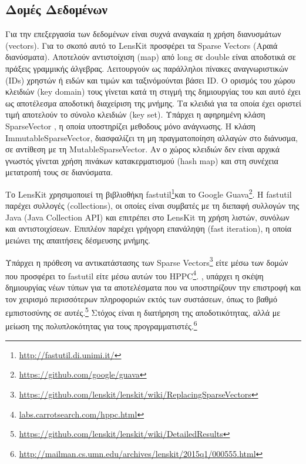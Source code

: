 \subsection{Δομές Δεδομένων}
Για την επεξεργασία των δεδομένων είναι συχνά αναγκαία η χρήση διανυσμάτων ({\en vectors}). Για το σκοπό αυτό το {\en LensKit} προσφέρει τα \en Sparse Vectors \el(Αραιά διανύσματα). Αποτελούν αντιστοίχιση ({\en map}) από {\en long} σε \en double  είναι αποδοτικά σε πράξεις γραμμικής άλγεβρας. Λειτουργούν ως παράλληλοι πίνακες αναγνωριστικών (\en IDs) \el χρηστών ή ειδών και τιμών και ταξινόμούνται βάσει \en ID. \el Ο ορισμός του χώρου κλειδιών (\en key domain) \el τους γίνεται κατά τη στιγμή της δημιουργίας του και αυτό έχει ως αποτέλεσμα αποδοτική διαχείριση της μνήμης. Τα κλειδιά για τα οποία έχει οριστεί τιμή αποτελούν το σύνολο κλειδιών \en(key set). \el Υπάρχει η αφηρημένη κλάση \en SparseVector \el, η οποία υποστηρίζει μεθοδους μόνο ανάγνωσης. Η κλάση \en ImmutableSparseVector, \el διασφαλίζει τη μη πραγματοποίηση αλλαγών στο διάνυσμα, σε αντίθεση με τη \en MutableSparseVector. \el Αν ο χώρος κλειδιών δεν είναι αρχικά γνωστός γίνεται χρήση πινάκων κατακερματισμού \en (hash map) \el και στη συνέχεια μετατροπή τους σε διανύσματα. \par
Το \en LensKit \el χρησιμοποιεί τη βιβλιοθήκη \en fastutil\footnote{\url{http://fastutil.di.unimi.it/}}\el και το \en Google Guava\footnote{\url{https://github.com/google/guava}}. H fastutil \el παρέχει συλλογές \en (collections), \el οι οποίες είναι συμβατές με τη διεπαφή συλλογών της \en Java (Java Collection API) \el και επιτρέπει στο \en LensKit \el τη χρήση λιστών, συνόλων και αντιστοιχίσεων. Επιπλέον παρέχει γρήγορη επανάληψη (\en fast iteration), \el η οποία μειώνει της απαιτήσεις δέσμευσης μνήμης. \par
Υπάρχει η πρόθεση να αντικατάστασης των \en Sparse Vectors\footnote{\url{https://github.com/lenskit/lenskit/wiki/ReplacingSparseVectors}} \el είτε μέσω των δομών που προσφέρει το \en fastutil \el είτε μέσω αυτών του \en HPPC\footnote{\url{labs.carrotsearch.com/hppc.html}}. , υπάρχει η σκέψη δημιουργίας νέων τύπων για τα αποτελέσματα που να υποστηρίζουν την επιστροφή και τον χειρισμό περισσότερων πληροφοριών εκτός των συστάσεων, όπως το βαθμό εμπιστοσύνης σε αυτές.\footnote{\en \url{https://github.com/lenskit/lenskit/wiki/DetailedResults}} Στόχος είναι η διατήρηση της αποδοτικότητας, αλλά με μείωση της πολυπλοκότητας για τους προγραμματιστές.\footnote{\en \url{http://mailman.cs.umn.edu/archives/lenskit/2015q1/000555.html}}
